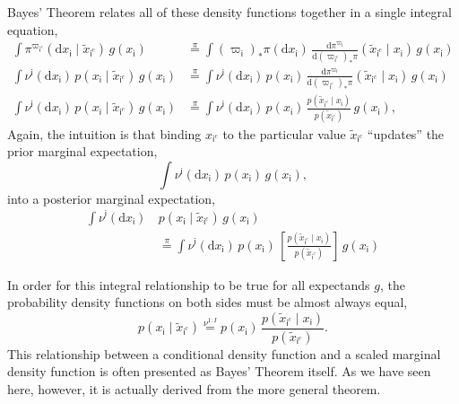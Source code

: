 \documentclass[
  letterpaper,
  DIV=11,
  numbers=noendperiod]{scrartcl}
\begin{document}
Bayes' Theorem relates all of these density functions together in a
single integral equation, \begin{align*}
\int
\pi^{ \varpi_{ \mathsf{i}^{c} } } (
  \mathrm{d} x_{ \mathsf{i} } \mid
  \tilde{x}_{ \mathsf{i}^{c} }
) \,
g ( x_{ \mathsf{i} } )
&\overset{ \pi }{=}
\int
( \varpi_{ \mathsf{i} } )_{*} \pi (
  \mathrm{d} x_{ \mathsf{i} } ) \,
\frac{
  \mathrm{d} \pi^{ \varpi_{\mathsf{i}} }
}{
  \mathrm{d} ( \varpi_{ \mathsf{i}^{c} } )_{*} \pi
}
( \tilde{x}_{ \mathsf{i}^{c} } \mid
  x_{\mathsf{i}}
) \,
g ( x_{ \mathsf{i} } )
\\
\int
\nu^{ \mathsf{i} } ( \mathrm{d} x_{ \mathsf{i} } ) \,
p ( x_{ \mathsf{i} } \mid \tilde{x}_{ \mathsf{i}^{c} } ) \,
g ( x_{ \mathsf{i} } )
&\overset{ \pi }{=}
\int
\nu^{ \mathsf{i} } ( \mathrm{d} x_{ \mathsf{i} } ) \,
p ( x_{ \mathsf{i} } ) \,
\frac{
  \mathrm{d} \pi^{ \varpi_{\mathsf{i}} }
}{
  \mathrm{d} ( \varpi_{ \mathsf{i}^{c} } )_{*} \pi
}
( \tilde{x}_{ \mathsf{i}^{c} } \mid
  x_{\mathsf{i}}
) \,
g ( x_{ \mathsf{i} } )
\\
\int
\nu^{ \mathsf{i} } ( \mathrm{d} x_{ \mathsf{i} } ) \,
p ( x_{ \mathsf{i} } \mid \tilde{x}_{ \mathsf{i}^{c} } ) \,
g ( x_{ \mathsf{i} } )
&\overset{ \pi }{=}
\int
\nu^{ \mathsf{i} } ( \mathrm{d} x_{ \mathsf{i} } ) \,
p ( x_{ \mathsf{i} } ) \,
\frac{
  p ( \tilde{x}_{ \mathsf{i}^{c} } \mid x_{\mathsf{i}} )
}{
  p ( \tilde{x}_{ \mathsf{i}^{c} } )
}\,
g ( x_{ \mathsf{i} } ),
\end{align*} Again, the intuition is that binding
\(x_{ \mathsf{i}^{c} }\) to the particular value
\(\tilde{x}_{ \mathsf{i}^{c} }\) ``updates'' the prior marginal
expectation, \[
\int
\nu^{ \mathsf{i} } ( \mathrm{d} x_{ \mathsf{i} } ) \,
p ( x_{ \mathsf{i} } ) \, g ( x_{ \mathsf{i} } ),
\] into a posterior marginal expectation, \begin{align*}
\int
\nu^{ \mathsf{i} } ( \mathrm{d} x_{ \mathsf{i} } ) \,
&p ( x_{ \mathsf{i} } \mid \tilde{x}_{ \mathsf{i}^{c} } ) \,
g ( x_{ \mathsf{i} } )
\\
&\overset{ \pi }{=}
\int
\nu^{ \mathsf{i} } ( \mathrm{d} x_{ \mathsf{i} } ) \,
p ( x_{ \mathsf{i} } ) \,
\left[
  \frac{
    p ( \tilde{x}_{ \mathsf{i}^{c} } \mid x_{\mathsf{i}} )
  }{
    p ( \tilde{x}_{ \mathsf{i}^{c} } )
  }
\right] \,
g ( x_{ \mathsf{i} } )
\end{align*}

In order for this integral relationship to be true for all expectands
\(g\), the probability density functions on both sides must be almost
always equal, \[
p ( x_{ \mathsf{i} } \mid \tilde{x}_{ \mathsf{i}^{c} } )
\overset{ \nu^{1:I} }{=}
p ( x_{ \mathsf{i} } ) \,
\frac{
  p ( \tilde{x}_{ \mathsf{i}^{c} } \mid x_{\mathsf{i}} )
}{
  p ( \tilde{x}_{ \mathsf{i}^{c} } )
}.
\] This relationship between a conditional density function and a scaled
marginal density function is often presented as Bayes' Theorem itself.
As we have seen here, however, it is actually derived from the more
general theorem.
\end{document}

